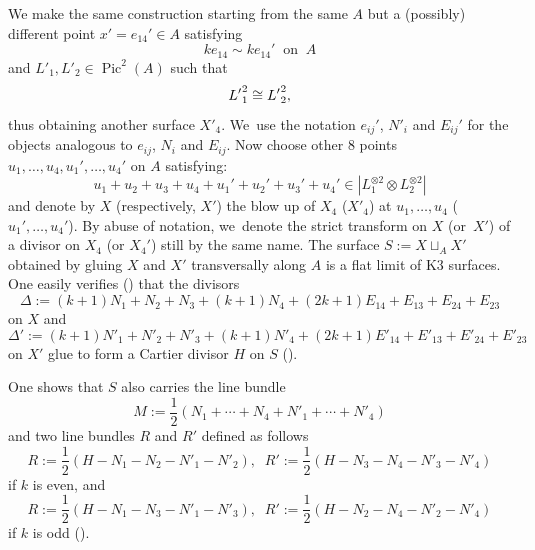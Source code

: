 \documentclass[JEP,XML,SOM,Unicode,NoEqCountersInSection,published]{cedram}
\theoremstyle{plain}
\theoremstyle{definition}
\DeclareMathOperator{\Pic}{Pic}
\begin{document}
\begin{center}
\end{center}

We make the same construction starting from the same $A$ but a (possibly) different point $x'=e_{14}'\in A$ satisfying
\begin{equation}\label{drei}
ke_{14} \sim ke_{14}' \;
\; \mbox{on} \; \; A
\end{equation}
and $L'_1, L'_2 \in \Pic^2(A)$ such that
\begin{equation}\label{zwei}{L'}_1^{\*2} \cong {L'}_2^{\*2},\end{equation}
thus obtaining another surface $X'_4$. We~use the notation $e_{ij}'$,
$N'_i$ and $E_{ij}'$ for the objects analogous to $e_{ij}$,
$N_i$ and $E_{ij}$.
Now choose other $8$ points $u_{1},\ldots,u_{4}, u_{1}',\ldots,u_{4}'$ on $A$
satisfying:
\[
u_1+u_2+u_3+u_4+u_1'+u_2'+u_3'+u_4'\in |L_1^{\otimes2}\otimes L_2^{\otimes 2}|
\]
and denote by $X$ (respectively, $X'$) the blow up of $X_4$ (\resp $X'_4$) at $u_{1},\ldots,u_{4}$ (\resp $u_{1}',\ldots,u_{4}'$). By abuse of notation, we~denote the strict transform on $X$ (or~$X'$) of a divisor on $X_4$ (or $X_4'$) still by the same name. The surface $S:= X \sqcup_{A} X'$ obtained by gluing $X$ and $X'$ transversally along $A$ is a flat limit of K3 surfaces.
One easily verifies (\cf \cite[Lem.\,5.1]{KLV1}) that the divisors
\[
 \Delta:= (k+1)N_1+N_2+N_3+(k+1)N_4+(2k+1)E_{14}+E_{13}+E_{24}+E_{23}
\]
on $X$ and
\[
 \Delta':=(k+1)N'_1+N'_2+N'_3+(k+1)N'_4+(2k+1)E'_{14}+E'_{13}+E'_{24}+E'_{23}
\]
on $X'$ glue to form a Cartier divisor $H$ on $S$ (\cf \cite[(35)]{KLV1}).

One shows that $S$ also carries the line bundle
\[
 M:=\frac{1}{2}\left(N_1+\cdots+N_4+N'_1+\cdots+N'_4\right)
\]
and two line bundles $R$ and $R'$ defined as follows
\begin{equation}
\label{eq:keven}
R:=\frac{1}{2}\left(H-N_1-N_2-N'_1-N'_2\right), \; \; R':=\frac{1}{2}\left(H-N_3-N_4-N'_3-N'_4\right)
\end{equation}
if $k$ is even, and
\begin{equation}\label{eq:kodd}
R:=\frac{1}{2}\left(H-N_1-N_3-N'_1-N'_3\right), \; \; R':=\frac{1}{2}\left(H-N_2-N_4-N'_2-N'_4\right)
\end{equation}
if $k$ is odd (\cf \cite[p.\,26]{KLV1}).
\end{document}
